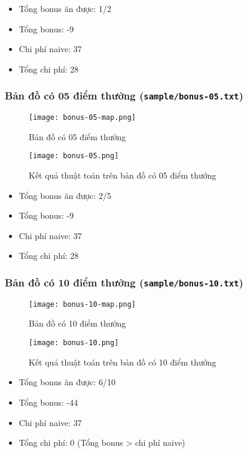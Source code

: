 \documentclass[12pt]{article}
\begin{document}
\begin{itemize}
	\item Tổng bonus ăn được: 1/2
	\item Tổng bonus: -9
	\item Chi phí naive: 37
	\item Tổng chi phí: 28
\end{itemize}

\subsubsection{Bản đồ có 05 điểm thưởng (\texttt{sample/bonus-05.txt})}
\begin{figure}[H]
	\centering
	\texttt{[image: bonus-05-map.png]}
	\caption{Bản đồ có 05 điểm thưởng}
\end{figure}

\begin{figure}[H]
	\centering
	\texttt{[image: bonus-05.png]}
	\caption{Kết quả thuật toán trên bản đồ có 05 điểm thưởng}
\end{figure}

\begin{itemize}
	\item Tổng bonus ăn được: 2/5
	\item Tổng bonus: -9
	\item Chi phí naive: 37
	\item Tổng chi phí: 28
\end{itemize}

\subsubsection{Bản đồ có 10 điểm thưởng (\texttt{sample/bonus-10.txt})}
\begin{figure}[H]
	\centering
	\texttt{[image: bonus-10-map.png]}
	\caption{Bản đồ có 10 điểm thưởng}
\end{figure}

\begin{figure}[H]
	\centering
	\texttt{[image: bonus-10.png]}
	\caption{Kết quả thuật toán trên bản đồ có 10 điểm thưởng}
\end{figure}

\begin{itemize}
\item Tổng bonus ăn được: 6/10
\item Tổng bonus: -44
\item Chi phí naive: 37
\item Tổng chi phí: 0 (Tổng bonus > chi phí naive)
\end{itemize}
\end{document}
